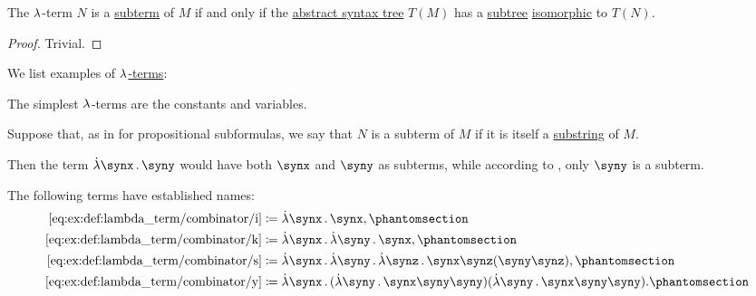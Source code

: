 \begin{proposition}\label{thm:lambda_term_ast_subterm}
  The \( {\mathrm \lambda} \)-term \( N \) is a \hyperref[def:lambda_subterm]{subterm} of \( M \) if and only if the \hyperref[def:lambda_term_ast]{abstract syntax tree} \( T(M) \) has a \hyperref[def:tree/subtree]{subtree} \hyperref[def:labeled_tree/homomorphism]{isomorphic} to \( T(N) \).
\end{proposition}
\begin{proof}
  Trivial.
\end{proof}

\begin{example}\label{ex:def:lambda_term}
  We list examples of \hyperref[def:lambda_term]{\( {\mathrm \lambda} \)-terms}:
  \begin{thmenum}
     The simplest \( {\mathrm \lambda} \)-terms are the constants and variables.

     Suppose that, as in  for propositional subformulas, we say that \( N \) is a subterm of \( M \) if it is itself a \hyperref[def:formal_language/substring]{substring} of \( M \).

    Then the term \( \qabs \synx \syny \) would have both \( \synx \) and \( \syny \) as subterms, while according to , only \( \syny \) is a subterm.

     The following terms have established names:
    \begin{align*}
      \ref{eq:ex:def:lambda_term/combinator/i} &\coloneqq \qabs \synx \synx,                                                           \taglabel[\ensuremath{I}]{eq:ex:def:lambda_term/combinator/i} \\
      \ref{eq:ex:def:lambda_term/combinator/k} &\coloneqq \qabs \synx \qabs \syny \synx,                                               \taglabel[\ensuremath{K}]{eq:ex:def:lambda_term/combinator/k} \\
      \ref{eq:ex:def:lambda_term/combinator/s} &\coloneqq \qabs \synx \qabs \syny \qabs \synz \synx \synz (\syny \synz),               \taglabel[\ensuremath{S}]{eq:ex:def:lambda_term/combinator/s} \\
      \ref{eq:ex:def:lambda_term/combinator/y} &\coloneqq \qabs \synx (\qabs \syny \synx \syny \syny) (\qabs \syny \synx \syny \syny). \taglabel[\ensuremath{Y}]{eq:ex:def:lambda_term/combinator/y}
    \end{align*}


\end{thmenum}
\end{example}

